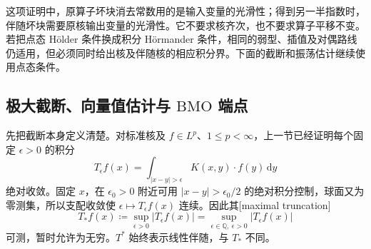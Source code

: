 这项证明中，原算子坏块消去常数用的是输入变量的光滑性；得到另一半指数时，伴随坏块需要原核输出变量的光滑性。它不要求核齐次，也不要求算子平移不变。若把点态 Hölder 条件换成积分 Hörmander 条件，相同的弱型、插值及对偶路线仍适用，但必须同时给出核及伴随核的相应积分界。下面的截断和振荡估计继续使用点态条件。

\subsection{极大截断、向量值估计与 \texorpdfstring{\(\mathrm{BMO}\)}{BMO} 端点}
\label{b2:subsec:180404}

先把截断本身定义清楚。对标准核及 \(f\in L^p\)、\(1\leq p<\infty\)，上一节已经证明每个固定 \(\epsilon>0\) 的积分
\[
 T_\epsilon f(x)=\int_{|x-y|>\epsilon}K(x,y)\cdot f(y)\,\mathrm dy
\]
绝对收敛。固定 \(x\)，在 \(\epsilon_0>0\) 附近可用 \(|x-y|>\epsilon_0/2\) 的绝对积分控制，球面又为零测集，所以支配收敛使 \(\epsilon\mapsto T_\epsilon f(x)\) 连续。因此其[maximal truncation]
\[
 T_*f(x)\coloneqq\sup_{\epsilon>0}|T_\epsilon f(x)|
       =\sup_{\epsilon\in\mathbb Q,\ \epsilon>0}|T_\epsilon f(x)|
\]
可测，暂时允许为无穷。\(T^*\) 始终表示线性伴随，与 \(T_*\) 不同。

